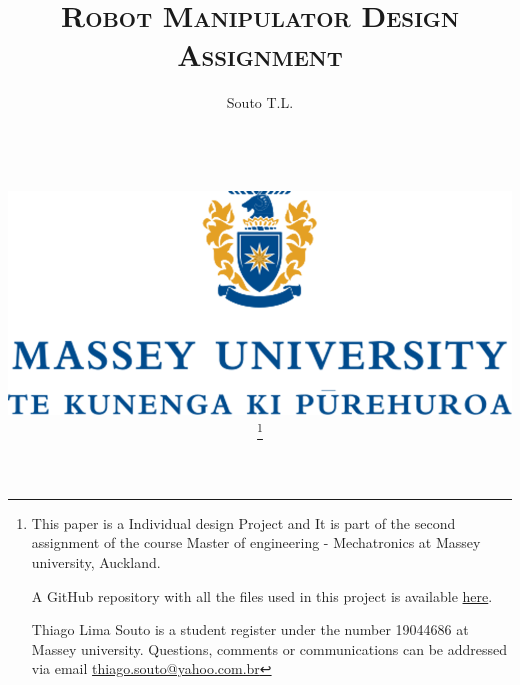 \documentclass[transmag]{IEEEtran}
\begin{document}
\title{\textsc{Robot Manipulator Design Assignment}}

\clearpage\thispagestyle{empty}

\author{Souto T.L.

\\
\\
\\

\begin{centering}
\vspace{20mm}
\includegraphics[scale=0.25]{massey-png}
\end{centering}



\thanks{This paper is a Individual design Project and It is part of the second assignment of the course Master of engineering - Mechatronics at Massey university, Auckland.

A GitHub repository with all the files used in this project is available \textcolor{blue}{\href{https://github.com/ThiagoSoutoGit/Pneumatics}{here}}. 

Thiago Lima Souto is a student register under the number 19044686 at Massey university. Questions, comments or communications can be addressed via email \color{blue}\href{mailto:thiago.souto@yahoo.com.br}{thiago.souto@yahoo.com.br}
}}




\end{document}
